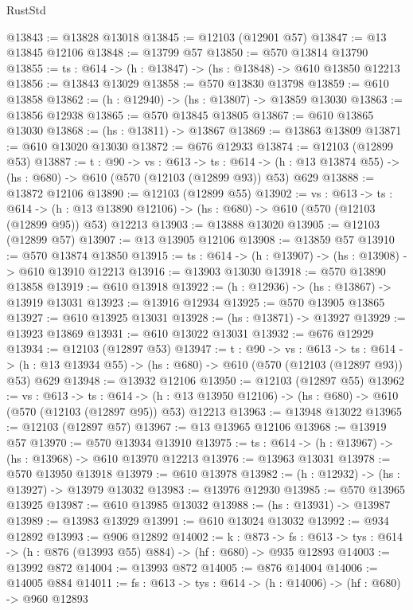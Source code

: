 \begin{lexlean}{RustStd}
\begin{coremodule}
@13843 := @13828 @13018
@13845 := @12103 (@12901 @57)
@13847 := @13 @13845 @12106
@13848 := @13799 @57
@13850 := @570 @13814 @13790
@13855 := {ts : @614} -> (h : @13847) -> (hs : @13848) -> @610 @13850 @12213
@13856 := @13843 @13029
@13858 := @570 @13830 @13798
@13859 := @610 @13858
@13862 := (h : @12940) -> (hs : @13807) -> @13859 @13030
@13863 := @13856 @12938
@13865 := @570 @13845 @13805
@13867 := @610 @13865 @13030
@13868 := (hs : @13811) -> @13867
@13869 := @13863 @13809
@13871 := @610 @13020 @13030
@13872 := @676 @12933
@13874 := @12103 (@12899 @53)
@13887 := {t : @90} ->
  {vs : @613} ->
  {ts : @614} -> (h : @13 @13874 @55) -> (hs : @680) -> @610 (@570 (@12103 (@12899 @93)) @53) @629
@13888 := @13872 @12106
@13890 := @12103 (@12899 @55)
@13902 := {vs : @613} ->
  {ts : @614} ->
  (h : @13 @13890 @12106) -> (hs : @680) -> @610 (@570 (@12103 (@12899 @95)) @53) @12213
@13903 := @13888 @13020
@13905 := @12103 (@12899 @57)
@13907 := @13 @13905 @12106
@13908 := @13859 @57
@13910 := @570 @13874 @13850
@13915 := {ts : @614} -> (h : @13907) -> (hs : @13908) -> @610 @13910 @12213
@13916 := @13903 @13030
@13918 := @570 @13890 @13858
@13919 := @610 @13918
@13922 := (h : @12936) -> (hs : @13867) -> @13919 @13031
@13923 := @13916 @12934
@13925 := @570 @13905 @13865
@13927 := @610 @13925 @13031
@13928 := (hs : @13871) -> @13927
@13929 := @13923 @13869
@13931 := @610 @13022 @13031
@13932 := @676 @12929
@13934 := @12103 (@12897 @53)
@13947 := {t : @90} ->
  {vs : @613} ->
  {ts : @614} -> (h : @13 @13934 @55) -> (hs : @680) -> @610 (@570 (@12103 (@12897 @93)) @53) @629
@13948 := @13932 @12106
@13950 := @12103 (@12897 @55)
@13962 := {vs : @613} ->
  {ts : @614} ->
  (h : @13 @13950 @12106) -> (hs : @680) -> @610 (@570 (@12103 (@12897 @95)) @53) @12213
@13963 := @13948 @13022
@13965 := @12103 (@12897 @57)
@13967 := @13 @13965 @12106
@13968 := @13919 @57
@13970 := @570 @13934 @13910
@13975 := {ts : @614} -> (h : @13967) -> (hs : @13968) -> @610 @13970 @12213
@13976 := @13963 @13031
@13978 := @570 @13950 @13918
@13979 := @610 @13978
@13982 := (h : @12932) -> (hs : @13927) -> @13979 @13032
@13983 := @13976 @12930
@13985 := @570 @13965 @13925
@13987 := @610 @13985 @13032
@13988 := (hs : @13931) -> @13987
@13989 := @13983 @13929
@13991 := @610 @13024 @13032
@13992 := @934 @12892
@13993 := @906 @12892
@14002 := {k : @873} ->
  {fs : @613} -> {tys : @614} -> (h : @876 (@13993 @55) @884) -> (hf : @680) -> @935 @12893
@14003 := @13992 @872
@14004 := @13993 @872
@14005 := @876 @14004
@14006 := @14005 @884
@14011 := {fs : @613} -> {tys : @614} -> (h : @14006) -> (hf : @680) -> @960 @12893

\end{coremodule}
\end{lexlean}
